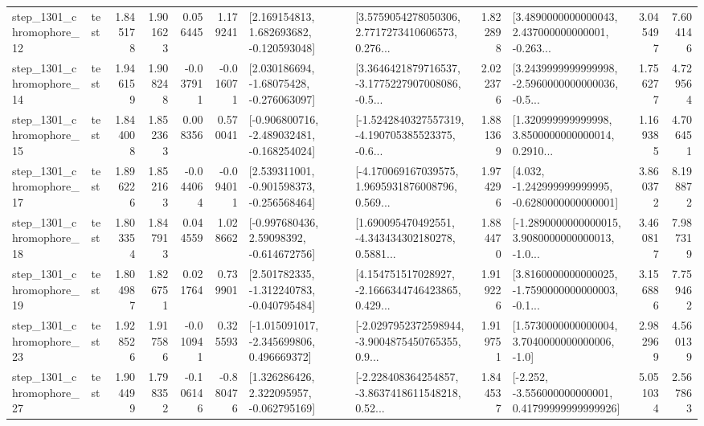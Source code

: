 \begin{tabular}{llrrrrllrlrr}
 step\_1301\_chromophore\_12 &      test &      1.845178 &    1.901623 &      0.056445 &  1.179241 &    [2.169154813, 1.682693682, -0.120593048] &  [3.5759054278050306, 2.7717273410606573, 0.276... &       1.822898 &  [3.4890000000000043, 2.437000000000001, -0.263... &            3.045497 &          7.604146 \\
 step\_1301\_chromophore\_14 &      test &      1.946159 &    1.908248 &     -0.037911 & -0.016071 &    [2.030186694, -1.68075428, -0.276063097] &  [3.3646421879716537, -3.1775227907008086, -0.5... &       2.022376 &  [3.2439999999999998, -2.5960000000000036, -0.5... &            1.756277 &          4.729564 \\
 step\_1301\_chromophore\_15 &      test &      1.844008 &    1.852363 &      0.008356 &  0.570041 &  [-0.906800716, -2.489032481, -0.168254024] &  [-1.5242840327557319, -4.190705385523375, -0.6... &       1.881369 &  [1.320999999999998, 3.8500000000000014, 0.2910... &            1.169385 &          4.706451 \\
 step\_1301\_chromophore\_17 &      test &      1.896226 &    1.852163 &     -0.044064 & -0.094011 &   [2.539311001, -0.901598373, -0.256568464] &  [-4.170069167039575, 1.9695931876008796, 0.569... &       1.974296 &   [4.032, -1.242999999999995, -0.6280000000000001] &            3.860372 &          8.198872 \\
 step\_1301\_chromophore\_18 &      test &      1.803354 &    1.847913 &      0.044559 &  1.028662 &    [-0.997680436, 2.59098392, -0.614672756] &  [1.690095470492551, -4.343434302180278, 0.5881... &       1.884470 &  [-1.2890000000000015, 3.9080000000000013, -1.0... &            3.460817 &          7.987319 \\
 step\_1301\_chromophore\_19 &      test &      1.804987 &    1.826751 &      0.021764 &  0.739901 &   [2.501782335, -1.312240783, -0.040795484] &  [4.154751517028927, -2.1666344746423865, 0.429... &       1.919226 &  [3.8160000000000025, -1.7590000000000003, -0.1... &            3.156886 &          7.759462 \\
 step\_1301\_chromophore\_23 &      test &      1.928526 &    1.917586 &     -0.010941 &  0.325593 &   [-1.015091017, -2.345699806, 0.496669372] &  [-2.0297952372598944, -3.9004875450765355, 0.9... &       1.919751 &     [1.5730000000000004, 3.7040000000000006, -1.0] &            2.982969 &          4.560139 \\
 step\_1301\_chromophore\_27 &      test &      1.904499 &    1.798352 &     -0.106146 & -0.880476 &    [1.326286426, 2.322095957, -0.062795169] &  [-2.228408364254857, -3.8637418611548218, 0.52... &       1.844537 &  [-2.252, -3.556000000000001, 0.41799999999999926] &            5.051034 &          2.567863 \\

\end{tabular}
